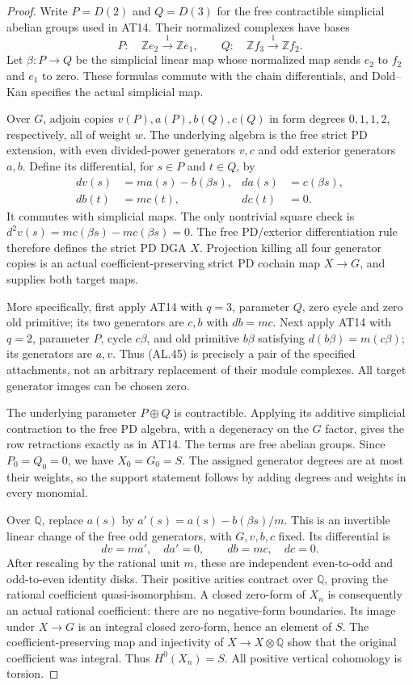 \begin{proof}
Write $P=D(2)$ and $Q=D(3)$ for the free contractible
simplicial abelian groups used in AT14.
Their normalized complexes have bases
\[
 P:\quad \mathbb Z e_2\xrightarrow{1}\mathbb Z e_1,
 \qquad
 Q:\quad \mathbb Z f_3\xrightarrow{1}\mathbb Z f_2.
\]
Let $\beta:P\to Q$ be the simplicial linear map
whose normalized map sends $e_2$ to $f_2$ and
$e_1$ to zero.  These formulas commute with the
chain differentials, and Dold--Kan specifies the
actual simplicial map.

Over $G$, adjoin copies $v(P),a(P),b(Q),c(Q)$ in
form degrees $0,1,1,2$, respectively, all of weight
$w$.  The underlying algebra is the free strict
PD extension, with even divided-power generators
$v,c$ and odd exterior generators $a,b$.
Define its differential, for $s\in P$ and $t\in Q$, by
\[
 \begin{aligned}
 dv(s)&=m a(s)-b(\beta s),& da(s)&=c(\beta s),\\
 db(t)&=m c(t),&dc(t)&=0.
 \end{aligned}
 \tag{AL.45}
\]
It commutes with simplicial maps.  The only nontrivial
square check is
$d^2v(s)=m c(\beta s)-m c(\beta s)=0$.
The free PD/exterior differentiation rule therefore
defines the strict PD DGA $X$.
Projection killing all four generator copies is an
actual coefficient-preserving strict PD cochain map
$X\to G$, and supplies both target maps.

More specifically, first apply AT14 with $q=3$,
parameter $Q$, zero cycle and zero old primitive;
its two generators are $c,b$ with $db=mc$.
Next apply AT14 with $q=2$, parameter $P$, cycle
$c\beta$, and old primitive $b\beta$ satisfying
$d(b\beta)=m(c\beta)$; its generators are $a,v$.
Thus \textup{(AL.45)} is precisely a pair of the
specified attachments, not an arbitrary replacement
of their module complexes.
All target generator images can be chosen zero.

The underlying parameter $P\oplus Q$ is contractible.
Applying its additive simplicial contraction to the
free PD algebra, with a degeneracy on the $G$ factor,
gives the row retractions exactly as in AT14.
The terms are free abelian groups.  Since
$P_0=Q_0=0$, we have $X_0=G_0=S$.
The assigned generator degrees are at most their
weights, so the support statement follows by adding
degrees and weights in every monomial.

Over $\mathbb Q$, replace $a(s)$ by
$a'(s)=a(s)-b(\beta s)/m$.  This is an invertible
linear change of the free odd generators, with
$G,v,b,c$ fixed.  Its differential is
\[
 dv=m a',\quad da'=0,\qquad db=m c,\quad dc=0.
\]
After rescaling by the rational unit $m$, these
are independent even-to-odd and odd-to-even
identity disks.  Their positive arities contract
over $\mathbb Q$, proving the rational coefficient
quasi-isomorphism.  A closed zero-form of $X_n$
is consequently an actual rational coefficient:
there are no negative-form boundaries.
Its image under $X\to G$ is an integral closed
zero-form, hence an element of $S$.
The coefficient-preserving map and injectivity of
$X\to X\otimes\mathbb Q$ show that the original
coefficient was integral.  Thus $H^0(X_n)=S$.
All positive vertical cohomology is torsion.


\end{proof}
